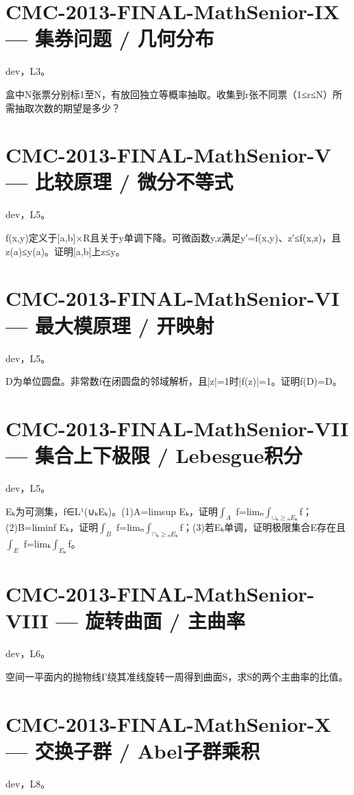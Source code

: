 \documentclass[UTF8]{ctexart}
\begin{document}
\section*{CMC-2013-FINAL-MathSenior-IX — 集券问题 / 几何分布}

dev，L3。

盒中N张票分别标1至N，有放回独立等概率抽取。收集到r张不同票（1≤r≤N）所需抽取次数的期望是多少？

\section*{CMC-2013-FINAL-MathSenior-V — 比较原理 / 微分不等式}

dev，L5。

f(x,y)定义于[a,b]×R且关于y单调下降。可微函数y,z满足y′=f(x,y)、z′≤f(x,z)，且z(a)≤y(a)。证明[a,b]上z≤y。

\section*{CMC-2013-FINAL-MathSenior-VI — 最大模原理 / 开映射}

dev，L5。

D为单位圆盘。非常数f在闭圆盘的邻域解析，且|z|=1时|f(z)|=1。证明f(D)=D。

\section*{CMC-2013-FINAL-MathSenior-VII — 集合上下极限 / Lebesgue积分}

dev，L5。

Eₖ为可测集，f∈L¹(∪ₖEₖ)。(1)A=limsup Eₖ，证明$∫_A$ f=limₙ$∫_{∪ₖ≥ₙEₖ}$f；(2)B=liminf Eₖ，证明$∫_B$ f=limₙ$∫_{∩ₖ≥ₙEₖ}$f；(3)若Eₖ单调，证明极限集合E存在且$∫_E$ f=limₖ$∫_{Eₖ}$f。

\section*{CMC-2013-FINAL-MathSenior-VIII — 旋转曲面 / 主曲率}

dev，L6。

空间一平面内的抛物线Γ绕其准线旋转一周得到曲面S，求S的两个主曲率的比值。

\section*{CMC-2013-FINAL-MathSenior-X — 交换子群 / Abel子群乘积}

dev，L8。
\end{document}
